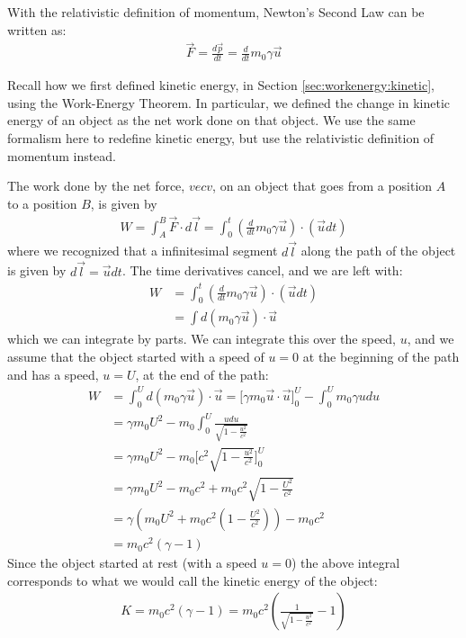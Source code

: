 With the relativistic definition of momentum, Newton's Second Law can be written as:
\begin{align*}
\vec F = \frac{d\vec p}{dt}=\frac{d}{dt}m_0\gamma\vec u 
\end{align*}

Recall how we first defined kinetic energy, in Section \ref{sec:workenergy:kinetic}, using the Work-Energy Theorem. In particular, we defined the change in kinetic energy of an object as the net work done on that object. We use the same formalism here to redefine kinetic energy, but use the relativistic definition of momentum instead.

The work done by the net force, $vec v$, on an object that goes from a position $A$ to a position $B$, is given by
\begin{align*}
W = \int_A^B \vec F\cdot d\vec l=\int_0^t \left(\frac{d}{dt}m_0\gamma\vec u \right)\cdot(\vec u dt)
\end{align*}
where we recognized that a infinitesimal segment $d\vec l$ along the path of the object is given by $d\vec l=\vec u dt$. The time derivatives cancel, and we are left with:
\begin{align*}
W&=\int_0^t \left(\frac{d}{dt}m_0\gamma\vec u \right)\cdot(\vec u dt)\\
&=\int d(m_0\gamma \vec u)\cdot \vec u
\end{align*}
which we can integrate by parts. We can integrate this over the speed, $u$, and we assume that the object started with a speed of $u=0$ at the beginning of the path and has a speed, $u=U$, at the end of the path:
\begin{align*}
W&=\int_0^U d(m_0\gamma \vec u)\cdot \vec u = \Big[\gamma m_0 \vec u\cdot\vec u\Big]_0^U-\int_0^U m_0\gamma u du\\
&=\gamma m_0 U^2-m_0\int_0^U\frac{udu}{\sqrt{1-\frac{u^2}{c^2}}}\\
&=\gamma m_0 U^2-m_0\Big[ c^2\sqrt{1-\frac{u^2}{c^2}} \Big]_0^U\\
&=\gamma m_0 U^2-m_0c^2+m_0c^2\sqrt{1-\frac{U^2}{c^2}}\\
&=\gamma \left(m_0 U^2+m_0c^2\left(1-\frac{U^2}{c^2}\right)\right)-m_0c^2\\
&=m_0c^2(\gamma -1)	
\end{align*}
Since the object started at rest (with a speed $u=0$) the above integral corresponds to what we would call the kinetic energy of the object:
\begin{align*}
K=m_0c^2(\gamma -1)=m_0c^2\left(\frac{1}{\sqrt{1-\frac{u^2}{c^2}}}-1\right)
\end{align*}
